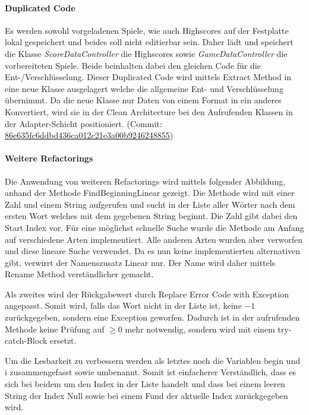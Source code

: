 \newpage
\paragraph{Duplicated Code}

Es werden sowohl vorgeladenen Spiele, wie auch Highscores auf der Festplatte lokal gespeichert und beides soll nicht editierbar sein. Daher lädt und speichert die Klasse \textit{ScoreDataController} die Highscores sowie \textit{GameDataController} die vorbereiteten Spiele. Beide beinhalten dabei den gleichen Code für die Ent-/Verschlüsselung. Dieser Duplicated Code wird mittels Extract Method in eine neue Klasse ausgelagert welche die allgemeine Ent- und Verschlüsselung übernimmt. Da die neue Klasse nur Daten von einem Format in ein anderes Konvertiert, wird sie in der Clean Architecture bei den Aufrufenden Klassen in der Adapter-Schicht positioniert. (Commit: \href{https://github.com/EinToni/Wortfinder/commit/86e635fc6ddbd436ca012c21e3a00b9246248855}{86e635fc6ddbd436ca012c21e3a00b9246248855})

\paragraph{Weitere Refactorings}
Die Anwendung von weiteren Refactorings wird mittels folgender Abbildung, anhand der Methode \glqq FindBeginningLinear\grqq{} gezeigt. Die Methode wird mit einer Zahl und einem String aufgerufen und sucht in der Liste aller Wörter nach dem ersten Wort welches mit dem gegebenen String beginnt. Die Zahl gibt dabei den Start Index vor. Für eine möglichst schnelle Suche wurde die Methode am Anfang auf verschiedene Arten implementiert. Alle anderen Arten wurden aber verworfen und diese lineare Suche verwendet. Da es nun keine implementierten alternativen gibt, verwirrt der Namenszusatz \glqq Linear\grqq{} nur. Der Name wird daher mittels \glqq Rename Method\grqq{} verständlicher gemacht. 

Als zweites wird der Rückgabewert durch \glqq Replace Error Code with Exception\grqq{} angepasst. Somit wird, falls das Wort nicht in der Liste ist, keine $-1$ zurückgegeben, sondern eine Exception geworfen. Dadurch ist in der aufrufenden Methode keine Prüfung auf $\ge 0$ mehr notwendig, sondern wird mit einem try-catch-Block ersetzt.

Um die Lesbarkeit zu verbessern werden als letztes noch die Variablen \glqq begin\grqq{} und \glqq i\grqq{} zusammengefasst sowie umbenannt. Somit ist einfacherer Verständlich, dass es sich bei beidem um den Index in der Liste handelt und dass bei einem leeren String der Index Null sowie bei einem Fund der aktuelle Index zurückgegeben wird. 

